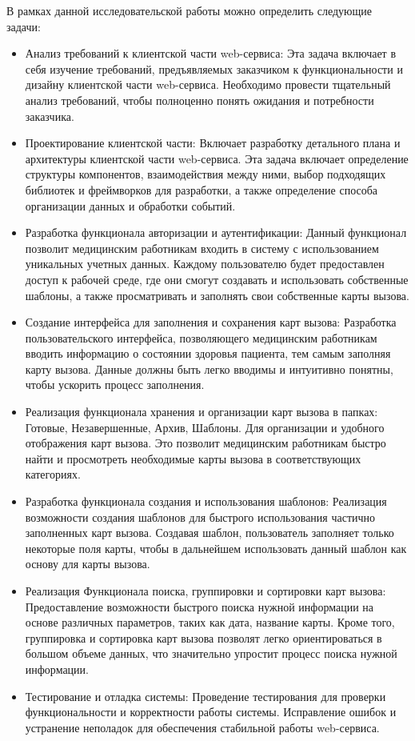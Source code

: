 В рамках данной исследовательской работы можно определить следующие задачи:
\begin{itemize}
    \item Анализ требований к клиентской части web-сервиса: Эта задача включает в себя изучение требований, предъявляемых заказчиком к функциональности и дизайну клиентской части web-сервиса. Необходимо провести тщательный анализ требований, чтобы полноценно понять ожидания и потребности заказчика.
    \item Проектирование клиентской части: Включает разработку детального плана и архитектуры клиентской части web-сервиса. Эта задача включает определение структуры компонентов, взаимодействия между ними, выбор подходящих библиотек и фреймворков для разработки, а также определение способа организации данных и обработки событий.
    \item Разработка функционала авторизации и аутентификации: Данный функционал позволит медицинским работникам входить в систему с использованием уникальных учетных данных. Каждому пользователю будет предоставлен доступ к рабочей среде, где они смогут создавать и использовать собственные шаблоны, а также просматривать и заполнять свои собственные карты вызова.
    \item Создание интерфейса для заполнения и сохранения карт вызова: Разработка пользовательского интерфейса, позволяющего медицинским работникам вводить информацию о состоянии здоровья пациента, тем самым заполняя карту вызова. Данные должны быть легко вводимы и интуитивно понятны, чтобы ускорить процесс заполнения.
    \item Реализация функционала хранения и организации карт вызова в папках: Готовые, Незавершенные, Архив, Шаблоны. Для организации и удобного отображения карт вызова. Это позволит медицинским работникам быстро найти и просмотреть необходимые карты вызова в соответствующих категориях.
    \item Разработка функционала создания и использования шаблонов: Реализация возможности создания шаблонов для быстрого использования частично заполненных карт вызова. Создавая шаблон, пользователь заполняет только некоторые поля карты, чтобы в дальнейшем использовать данный шаблон как основу для карты вызова.
    \item Реализация Функционала поиска, группировки и сортировки карт вызова: Предоставление возможности быстрого поиска нужной информации на основе различных параметров, таких как дата, название карты. Кроме того, группировка и сортировка карт вызова позволят легко ориентироваться в большом объеме данных, что значительно упростит процесс поиска нужной информации.
    \item Тестирование и отладка системы: Проведение тестирования для проверки функциональности и корректности работы системы. Исправление ошибок и устранение неполадок для обеспечения стабильной работы web-сервиса.
\end{itemize}


